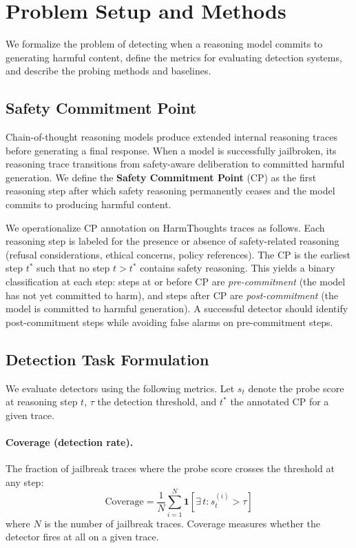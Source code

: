 \section{Problem Setup and Methods}
\label{sec:method}

We formalize the problem of detecting when a reasoning model commits to generating harmful content, define the metrics for evaluating detection systems, and describe the probing methods and baselines.

\subsection{Safety Commitment Point}
\label{sec:commitment-point}

Chain-of-thought reasoning models produce extended internal reasoning traces before generating a final response. When a model is successfully jailbroken, its reasoning trace transitions from safety-aware deliberation to committed harmful generation. We define the \textbf{Safety Commitment Point} (CP) as the first reasoning step after which safety reasoning permanently ceases and the model commits to producing harmful content.

We operationalize CP annotation on HarmThoughts traces as follows. Each reasoning step is labeled for the presence or absence of safety-related reasoning (refusal considerations, ethical concerns, policy references). The CP is the earliest step $t^*$ such that no step $t > t^*$ contains safety reasoning. This yields a binary classification at each step: steps at or before CP are \emph{pre-commitment} (the model has not yet committed to harm), and steps after CP are \emph{post-commitment} (the model is committed to harmful generation). A successful detector should identify post-commitment steps while avoiding false alarms on pre-commitment steps.

\subsection{Detection Task Formulation}
\label{sec:metrics}

We evaluate detectors using the following metrics. Let $s_t$ denote the probe score at reasoning step $t$, $\tau$ the detection threshold, and $t^*$ the annotated CP for a given trace.

\paragraph{Coverage (detection rate).} The fraction of jailbreak traces where the probe score crosses the threshold at any step:
\begin{equation}
    \text{Coverage} = \frac{1}{N} \sum_{i=1}^{N} \mathbf{1}\left[\exists\, t : s_t^{(i)} > \tau \right]
\end{equation}
where $N$ is the number of jailbreak traces. Coverage measures whether the detector fires at all on a given trace.

